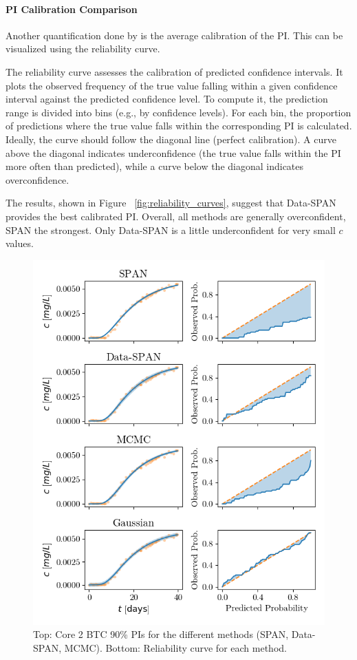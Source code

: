 \paragraph{PI Calibration Comparison}
Another quantification done by \cite{finn} is the average calibration of the PI. This can be visualized using the reliability curve.

The reliability curve assesses the calibration of predicted confidence intervals. It plots the observed frequency of the true value falling within a given confidence interval against the predicted confidence level. To compute it, the prediction range is divided into bins (e.g., by confidence levels). For each bin, the proportion of predictions where the true value falls within the corresponding PI is calculated. Ideally, the curve should follow the diagonal line (perfect calibration). A curve above the diagonal indicates underconfidence (the true value falls within the PI more often than predicted), while a curve below the diagonal indicates overconfidence.

The results, shown in Figure ~\vref{fig:reliability_curves}, suggest that Data-SPAN provides the best calibrated PI. Overall, all methods are generally overconfident, SPAN the strongest. Only Data-SPAN is a little underconfident for very small $c$ values.

\begin{figure}[h]
    \centering
    \includegraphics{figs/reliability_curves.png}
    \caption{Top: Core 2 BTC 90\% PIs for the different methods (SPAN, Data-SPAN, MCMC). Bottom: Reliability curve for each method.}
    \label{fig:reliability_curves}
\end{figure}


